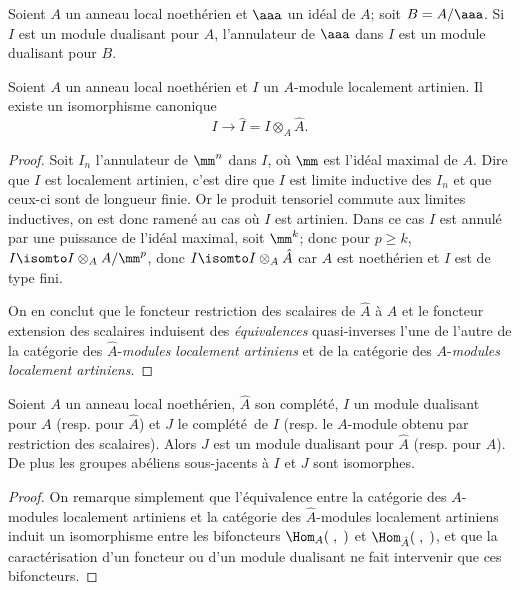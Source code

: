 \begin{corollaire} \label{IV.4.4} Soient $A$ un anneau local noeth\'erien et $\aaa$ un id\'eal de $A$; soit $B=A/\aaa$. Si $I$ est un module dualisant pour $A$, l'annulateur de $\aaa$ dans $I$ est un module dualisant pour $B$.
\end{corollaire}

\begin{lemme} \label{IV.4.5} Soient $A$ un anneau local noeth\'erien et $I$ un $A$-module localement artinien. Il existe un isomorphisme canonique
$$
I\to \hat{I}=I\otimes_{A}\hat{A}.
$$
\end{lemme}

\begin{proof}
Soit $I_{n}$ l'annulateur de $\mm^n$ dans $I$, o\`u $\mm$ est l'id\'eal maximal de $A$. Dire que $I$ est localement artinien, c'est dire que $I$ est limite inductive des $I_{n}$ et que ceux-ci sont de longueur finie. Or le produit tensoriel commute aux limites inductives, on est donc ramen\'e au cas o\`u $I$ est artinien. Dans ce cas $I$ est annul\'e par une puissance de l'id\'eal maximal, soit $\mm^{k}$; donc pour $p\geq k$, $I\isomto I\otimes_{A}A/\mm^{p}$, donc $I\isomto I\otimes_{A}\hat{A}$ car $A$ est noeth\'erien et $I$ est de type fini.

On en conclut que le foncteur restriction des scalaires de $\hat{A}$ \`a $A$ et le foncteur extension des scalaires induisent des \emph{équivalences} quasi-inverses l'une de l'autre de la cat\'egorie des $\hat{A}$-\emph{modules localement artiniens} et de la cat\'egorie des $A$-\emph{modules localement artiniens}.
\skipqed
\end{proof}

\begin{proposition} \label{IV.4.6}
Soient $A$ un anneau local noeth\'erien, $\hat{A}$ son compl\'et\'e, $I$ un module dualisant pour $A$ (resp. pour $\hat{A}$) et $J$ le compl\'et\'e\, de $I$ (resp. le $A$-module obtenu par restriction des scalaires). Alors $J$ est un module dualisant pour $\hat{A}$ (resp. pour $A$). De plus les groupes ab\'eliens sous-jacents \`a $I$ et $J$ sont isomorphes.
\end{proposition}

\begin{proof}
On remarque simplement que l'\'equivalence entre la cat\'egorie des $A$-modules localement artiniens et la cat\'egorie des $\hat{A}$-modules localement artiniens induit un isomorphisme entre les bifoncteurs $\Hom_{A}(\;, \;)$ et $\Hom_{\hat{A}}(\;, \;)$, et que la caract\'erisation d'un foncteur ou d'un module dualisant ne fait intervenir que ces bifoncteurs.
\skipqed
\end{proof}

